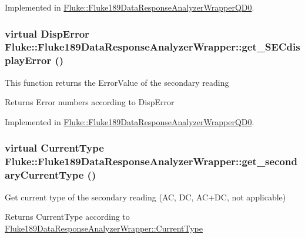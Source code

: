 Implemented in \hyperlink{classFluke_1_1Fluke189DataResponseAnalyzerWrapperQD0_af71dd62d9f81866ad3cb96c580754329}{Fluke::Fluke189DataResponseAnalyzerWrapperQD0}.\hypertarget{classFluke_1_1Fluke189DataResponseAnalyzerWrapper_a28c8a2bcca43f33e1b1becf9d5ffa76c}{
\subsubsection[{get\_\-SECdisplayError}]{\setlength{\rightskip}{0pt plus 5cm}virtual {\bf DispError} Fluke::Fluke189DataResponseAnalyzerWrapper::get\_\-SECdisplayError ()}}
\label{classFluke_1_1Fluke189DataResponseAnalyzerWrapper_a28c8a2bcca43f33e1b1becf9d5ffa76c}
This function returns the ErrorValue of the secondary reading \begin{DoxyReturn}{Returns}
Error numbers according to DispError 
\end{DoxyReturn}


Implemented in \hyperlink{classFluke_1_1Fluke189DataResponseAnalyzerWrapperQD0_a26e5925f4ca96aeea4115c44aa8ed1a8}{Fluke::Fluke189DataResponseAnalyzerWrapperQD0}.\hypertarget{classFluke_1_1Fluke189DataResponseAnalyzerWrapper_a21a39a54587e31af04c931b46aa11806}{
\subsubsection[{get\_\-secondaryCurrentType}]{\setlength{\rightskip}{0pt plus 5cm}virtual {\bf CurrentType} Fluke::Fluke189DataResponseAnalyzerWrapper::get\_\-secondaryCurrentType ()}}
\label{classFluke_1_1Fluke189DataResponseAnalyzerWrapper_a21a39a54587e31af04c931b46aa11806}
Get current type of the secondary reading (AC, DC, AC+DC, not applicable) \begin{DoxyReturn}{Returns}
CurrentType according to \hyperlink{classFluke_1_1Fluke189DataResponseAnalyzerWrapper_afef24496da239e3613c40ad3582d7adc}{Fluke189DataResponseAnalyzerWrapper::CurrentType} 
\end{DoxyReturn}


